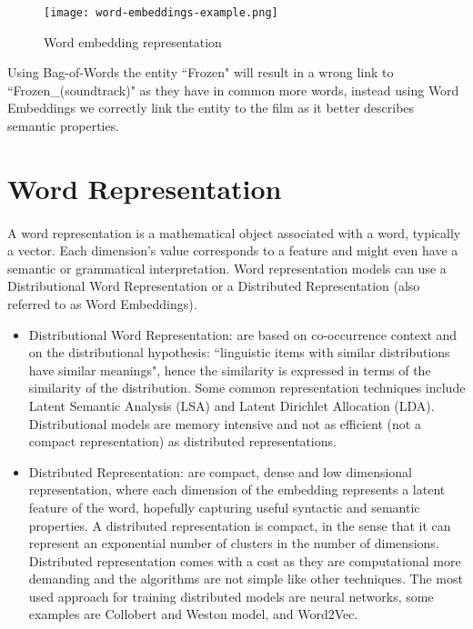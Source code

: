 \pagebreak


\begin{figure}[h!]
\texttt{[image: word-embeddings-example.png]}
\caption{Word embedding representation}
\label{fig:word_embedding_similarity}
\end{figure}


Using Bag-of-Words the entity ``Frozen" will result in a wrong link to ``Frozen\_(soundtrack)" as they have in common more words, instead using Word Embeddings we correctly link the entity to the film as it better describes semantic properties.

\nocite{sebastianruder}
\nocite{turian2010word}
\nocite{mccormick2017skipgram}
\nocite{Thalhammer2016}
\section{Word Representation}
\paragraph{}
A word representation is a mathematical object associated with a word, typically a vector. Each dimension’s value corresponds to a feature and might even have a semantic or grammatical interpretation. Word representation models can use a Distributional Word Representation or a Distributed Representation (also referred to as Word Embeddings).

\begin{itemize}[itemsep = 0.1em]
\item Distributional Word Representation: are based on co-occurrence context and on the distributional hypothesis:  ``linguistic items with similar distributions have similar meanings", hence the similarity is expressed in terms of the similarity of the distribution. Some common representation techniques include Latent Semantic Analysis (LSA) and Latent Dirichlet Allocation (LDA). Distributional models are memory intensive and not as efficient (not a compact representation) as distributed representations.

\item Distributed Representation: are compact, dense and low dimensional representation, where each dimension of the embedding represents a latent feature of the word, hopefully capturing useful syntactic and semantic properties. A distributed representation is compact, in the sense that it can represent an exponential number of clusters in the number of dimensions. Distributed representation comes with a cost as they are computational more demanding and the algorithms are not simple like other techniques. The most used approach for training distributed models are neural networks, some examples are Collobert and Weston model, and Word2Vec.
\end{itemize}

